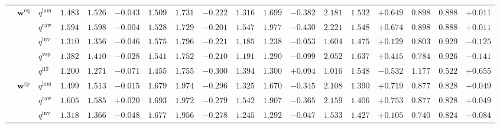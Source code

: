\documentclass[eng]{kjas3}
\begin{document}
\begin{table}[t]
{\begin{tabular}{lll ccc ccc ccc ccc ccc}
\cmidrule(lr){2-18}
 & $\mathbf{w}^{\mathrm{eq}}$ & $q^{\mathrm{lam}}$ & $1.483$ & $1.526$ & \cellcolor{negred!50}$-0.043$ & $1.509$ & $1.731$ & \cellcolor{negred!50}$-0.222$ & $1.316$ & $1.699$ & \cellcolor{negred!50}$-0.382$ & $2.181$ & $1.532$ & \cellcolor{posgreen!50}$+0.649$ & $0.898$ & $0.888$ & \cellcolor{posgreen!50}$+0.011$ \\
 &  & $q^{\mathrm{raw}}$ & $1.594$ & $1.598$ & \cellcolor{negred!50}$-0.004$ & $1.528$ & $1.729$ & \cellcolor{negred!50}$-0.201$ & $1.547$ & $1.977$ & \cellcolor{negred!50}$-0.430$ & $2.221$ & $1.548$ & \cellcolor{posgreen!50}$+0.674$ & $0.898$ & $0.888$ & \cellcolor{posgreen!50}$+0.011$ \\
 &  & $q^{\mathrm{inv}}$ & $1.310$ & $1.356$ & \cellcolor{negred!50}$-0.046$ & $1.575$ & $1.796$ & \cellcolor{negred!50}$-0.221$ & $1.185$ & $1.238$ & \cellcolor{negred!50}$-0.053$ & $1.604$ & $1.475$ & \cellcolor{posgreen!50}$+0.129$ & $0.803$ & $0.929$ & \cellcolor{negred!50}$-0.125$ \\
 &  & $q^{\mathrm{vsp}}$ & $1.382$ & $1.410$ & \cellcolor{negred!50}$-0.028$ & $1.541$ & $1.752$ & \cellcolor{negred!50}$-0.210$ & $1.191$ & $1.290$ & \cellcolor{negred!50}$-0.099$ & $2.052$ & $1.637$ & \cellcolor{posgreen!50}$+0.415$ & $0.784$ & $0.926$ & \cellcolor{negred!50}$-0.141$ \\
 &  & $q^{\mathrm{ff3}}$ & $1.200$ & $1.271$ & \cellcolor{negred!50}$-0.071$ & $1.455$ & $1.755$ & \cellcolor{negred!50}$-0.300$ & $1.394$ & $1.300$ & \cellcolor{posgreen!50}$+0.094$ & $1.016$ & $1.548$ & \cellcolor{negred!50}$-0.532$ & $1.177$ & $0.522$ & \cellcolor{posgreen!50}$+0.655$ \\
\cmidrule(lr){2-18}
 & $\mathbf{w}^{\mathrm{rp}}$ & $q^{\mathrm{lam}}$ & $1.499$ & $1.513$ & \cellcolor{negred!50}$-0.015$ & $1.679$ & $1.974$ & \cellcolor{negred!50}$-0.296$ & $1.325$ & $1.670$ & \cellcolor{negred!50}$-0.345$ & $2.108$ & $1.390$ & \cellcolor{posgreen!50}$+0.719$ & $0.877$ & $0.828$ & \cellcolor{posgreen!50}$+0.049$ \\
 &  & $q^{\mathrm{raw}}$ & $1.605$ & $1.585$ & \cellcolor{posgreen!50}$+0.020$ & $1.693$ & $1.972$ & \cellcolor{negred!50}$-0.279$ & $1.542$ & $1.907$ & \cellcolor{negred!50}$-0.365$ & $2.159$ & $1.406$ & \cellcolor{posgreen!50}$+0.753$ & $0.877$ & $0.828$ & \cellcolor{posgreen!50}$+0.049$ \\
 &  & $q^{\mathrm{inv}}$ & $1.318$ & $1.366$ & \cellcolor{negred!50}$-0.048$ & $1.677$ & $1.956$ & \cellcolor{negred!50}$-0.278$ & $1.245$ & $1.292$ & \cellcolor{negred!50}$-0.047$ & $1.533$ & $1.427$ & \cellcolor{posgreen!50}$+0.105$ & $0.740$ & $0.824$ & \cellcolor{negred!50}$-0.084$ \\

\end{tabular}}
\end{table}
\end{document}

